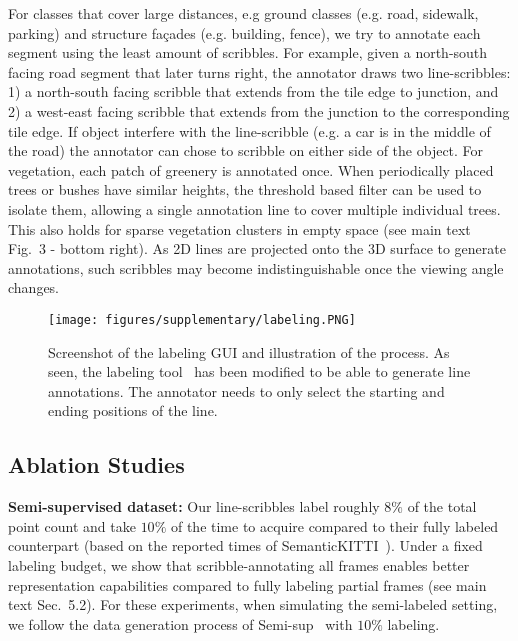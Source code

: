 \documentclass[10pt,twocolumn,letterpaper]{article}
\begin{document}
For classes that cover large distances, e.g ground classes (e.g. road, sidewalk, parking) and structure fa\c cades (e.g. building, fence), we try to annotate each segment using the least amount of scribbles. For example, given a north-south facing road segment that later turns right, the annotator draws two line-scribbles: 1) a north-south facing scribble that extends from the tile edge to junction, and 2) a west-east facing scribble that extends from the junction to the corresponding tile edge. If object interfere with the line-scribble (e.g. a car is in the middle of the road) the annotator can chose to scribble on either side of the object. For vegetation, each patch of greenery is annotated once. When periodically placed trees or bushes have similar heights, the threshold based filter can be used to isolate them, allowing a single annotation line to cover multiple individual trees. This also holds for sparse vegetation clusters in empty space (see main text Fig.~3 - bottom right). As 2D lines are projected onto the 3D surface to generate annotations, such scribbles may become indistinguishable once the viewing angle changes.

\begin{figure}[t]
    \centering
    \texttt{[image: figures/supplementary/labeling.PNG]}
    \caption{Screenshot of the labeling GUI and illustration of the process. As seen, the labeling tool~\cite{iccv2019semantickitti} has been modified to be able to generate line annotations. The annotator needs to only select the starting and ending positions of the line.}
    \label{fig:labeling}
\end{figure}

\subsection{Ablation Studies}

\noindent \textbf{Semi-supervised dataset:} Our line-scribbles label roughly $8\%$ of the total point count and take $10\%$ of the time to acquire compared to their fully labeled counterpart (based on the reported times of SemanticKITTI~\cite{iccv2019semantickitti}). Under a fixed labeling budget, we show that scribble-annotating all frames enables better representation capabilities compared to fully labeling partial frames (see main text Sec.~5.2). For these experiments, when simulating the semi-labeled setting, we follow the data generation process of Semi-sup~\cite{iccv2021guided} with $10\%$ labeling.
\end{document}

